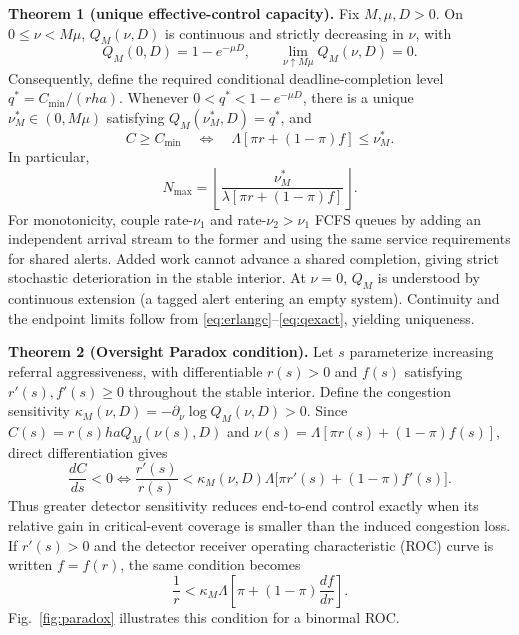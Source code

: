 \documentclass[letterpaper,10pt,conference]{ieeeconf}
\begin{document}
\textbf{Theorem 1 (unique effective-control capacity).}
Fix $M,\mu,D>0$. On $0\le\nu<M\mu$, $Q_M(\nu,D)$ is continuous and strictly
decreasing in $\nu$, with
\begin{equation}
Q_M(0,D)=1-e^{-\mu D},\qquad
\lim_{\nu\uparrow M\mu}Q_M(\nu,D)=0.
\end{equation}
Consequently, define the required conditional deadline-completion level
$q^*=C_{\min}/(rha)$. Whenever
$0<q^*<1-e^{-\mu D}$, there is a unique
$\nu_M^*\in(0,M\mu)$ satisfying $Q_M(\nu_M^*,D)=q^*$, and
\begin{equation}
C\ge C_{\min}
\quad\Longleftrightarrow\quad
\Lambda[\pi r+(1-\pi)f]\le\nu_M^*.
\label{eq:capacity-frontier}
\end{equation}
In particular,
\begin{equation}
N_{\max}=\left\lfloor
\frac{\nu_M^*}{\lambda[\pi r+(1-\pi)f]}
\right\rfloor.
\end{equation}
For monotonicity, couple rate-\(\nu_1\) and rate-\(\nu_2>\nu_1\) FCFS
queues by adding an independent arrival stream to the former and using the same
service requirements for shared alerts. Added work cannot advance a shared
completion, giving strict stochastic deterioration in the stable interior.
At \(\nu=0\), \(Q_M\) is understood by continuous extension (a tagged alert
entering an empty system). Continuity and the endpoint limits follow from
\eqref{eq:erlangc}--\eqref{eq:qexact}, yielding uniqueness.

\textbf{Theorem 2 (Oversight Paradox condition).}
Let $s$ parameterize increasing referral aggressiveness, with differentiable
$r(s)>0$ and $f(s)$ satisfying $r'(s),f'(s)\ge0$ throughout the stable
interior. Define the congestion sensitivity
\(\kappa_M(\nu,D)=-\partial_\nu\log Q_M(\nu,D)>0\). Since
$C(s)=r(s)haQ_M(\nu(s),D)$ and
$\nu(s)=\Lambda[\pi r(s)+(1-\pi)f(s)]$, direct differentiation gives
\begin{equation}
\frac{dC}{ds}<0
\iff
\frac{r'(s)}{r(s)}
<\kappa_M(\nu,D)\Lambda
\bigl[\pi r'(s)+(1-\pi)f'(s)\bigr].
\label{eq:oversight-condition}
\end{equation}
Thus greater detector sensitivity reduces end-to-end control exactly when its
relative gain in critical-event coverage is smaller than the induced
congestion loss. If \(r'(s)>0\) and the detector receiver operating characteristic (ROC) curve
is written $f=f(r)$, the same condition
becomes
\begin{equation}
\frac{1}{r}<\kappa_M\Lambda
\left[\pi+(1-\pi)\frac{df}{dr}\right].
\end{equation}
Fig.~\ref{fig:paradox} illustrates this condition for a binormal ROC.
\end{document}
